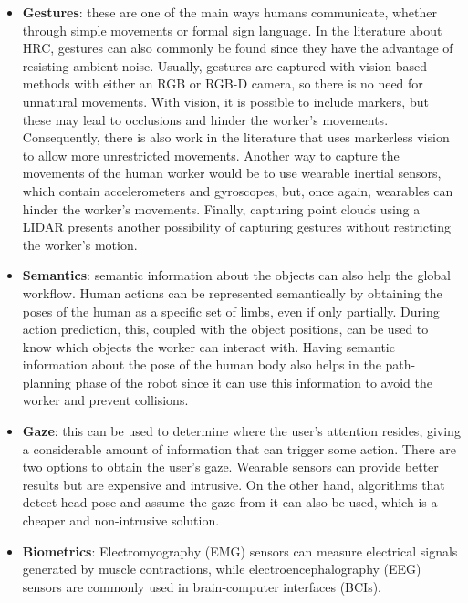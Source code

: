 \documentclass[conference]{IEEEtran}
\begin{document}
\begin{itemize}
\item \textbf{Gestures}: these are one of the main ways humans communicate, whether through simple movements or formal sign language. In the literature about HRC, gestures can also commonly be found since they have the advantage of resisting ambient noise. Usually, gestures are captured with vision-based methods with either an RGB or RGB-D camera, so there is no need for unnatural movements. With vision, it is possible to include markers, but these may lead to occlusions and hinder the worker’s movements. Consequently, there is also work in the literature that uses markerless vision to allow more unrestricted movements. Another way to capture the movements of the human worker would be to use wearable inertial sensors, which contain accelerometers and gyroscopes, but, once again, wearables can hinder the worker’s movements. Finally, capturing point clouds using a LIDAR presents another possibility of capturing gestures without restricting the worker’s motion.

\item \textbf{Semantics}: semantic information about the objects can also help the global workflow. Human actions can be represented semantically by obtaining the poses of the human as a specific set of limbs, even if only partially. During action prediction, this, coupled with the object positions, can be used to know which objects the worker can interact with. Having semantic information about the pose of the human body also helps in the path-planning phase of the robot since it can use this information to avoid the worker and prevent collisions.

\item \textbf{Gaze}: this can be used to determine where the user’s attention resides, giving a considerable amount of information that can trigger some action. There are two options to obtain the user’s gaze. Wearable sensors can provide better results but are expensive and intrusive. On the other hand, algorithms that detect head pose and assume the gaze from it can also be used, which is a cheaper and non-intrusive solution.

\item \textbf{Biometrics}: Electromyography (EMG) sensors can measure electrical signals generated by muscle contractions, while electroencephalography (EEG) sensors are commonly used in brain-computer interfaces (BCIs). %

\end{itemize}
\end{document}
